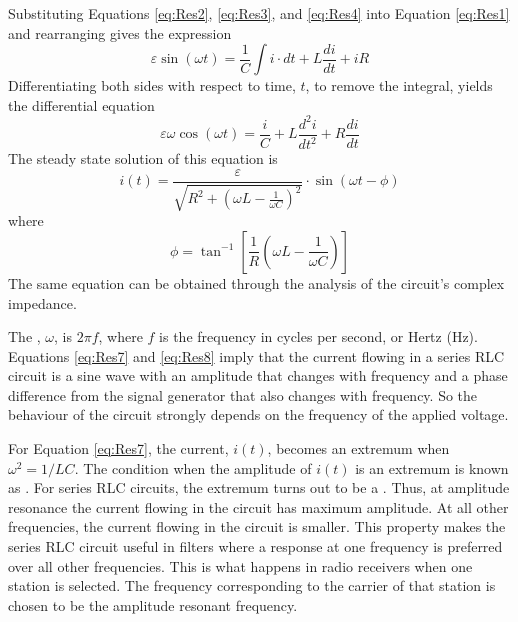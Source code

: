 \noindent Substituting Equations \ref{eq:Res2}, \ref{eq:Res3}, and \ref{eq:Res4} into Equation \ref{eq:Res1} and rearranging gives the expression \begin{equation}\label{eq:Res5}
    \varepsilon\sin(\omega t) = \frac{1}{C}\int i\cdot dt + L\frac{di}{dt} + iR
\end{equation}
Differentiating both sides with respect to time, $t$, to remove the integral, yields the differential equation \begin{equation}\label{eq:Res6}
    \varepsilon\omega\cos(\omega t) = \frac{i}{C} + L\frac{d^2i}{dt^2} + R\frac{di}{dt}
\end{equation}
The steady state solution of this equation is \begin{equation}\label{eq:Res7}
    i(t) = \frac{\varepsilon}{\sqrt{R^2+\left(\omega L - \frac{1}{\omega C}\right)^2}}\cdot\sin(\omega t - \phi)
\end{equation}
where \begin{equation}\label{eq:Res8}
    \phi = \tan^{-1}\left[\frac{1}{R}\left(\omega L - \frac{1}{\omega C}\right)\right]
\end{equation}
The same equation can be obtained through the analysis of the circuit's complex impedance.

\noindent The , $\omega$, is $2\pi f$, where $f$ is the frequency in cycles per second, or Hertz (Hz). Equations \ref{eq:Res7} and \ref{eq:Res8} imply that the current flowing in a series RLC circuit is a sine wave with an amplitude that changes with frequency and a phase difference from the signal generator that also changes with frequency. So the behaviour of the circuit strongly depends on the frequency of the applied voltage.

\noindent For Equation \ref{eq:Res7}, the current, $i(t)$, becomes an extremum when $\omega^2 = 1/LC$. The condition when the amplitude of $i(t)$ is an extremum is known as . For series RLC circuits, the extremum turns out to be a . Thus, at amplitude resonance the current flowing in the circuit has maximum amplitude. At all other frequencies, the current flowing in the circuit is smaller. This property makes the series RLC circuit useful in filters where a response at one frequency is preferred over all other frequencies. This is what happens in radio receivers when one station is selected. The frequency corresponding to the carrier of that station is chosen to be the amplitude resonant frequency.

